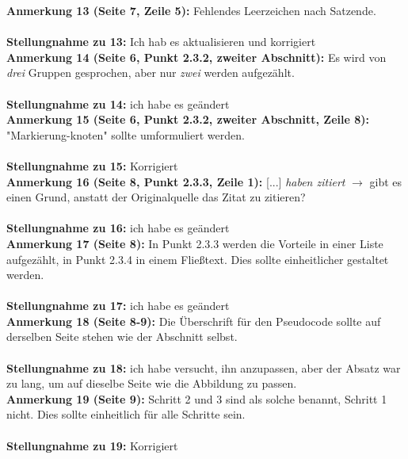 \documentclass[a4paper,12pt]{book}
\begin{document}
\noindent
\textbf{Anmerkung 13 (Seite 7, Zeile 5):}
Fehlendes Leerzeichen nach Satzende. \\
\\
\textbf{Stellungnahme zu 13:}
Ich hab es aktualisieren und korrigiert
\\

\noindent
\textbf{Anmerkung 14 (Seite 6, Punkt 2.3.2, zweiter Abschnitt):}
Es wird von \emph{drei} Gruppen gesprochen, aber nur \emph{zwei} werden aufgezählt.
 \\ \\
\textbf{Stellungnahme zu 14:} ich habe es geändert
\\

\noindent
\textbf{Anmerkung 15 (Seite 6, Punkt 2.3.2, zweiter Abschnitt, Zeile 8):}
"Markierung-knoten" sollte umformuliert werden. 
\\ \\
\textbf{Stellungnahme zu 15:} Korrigiert
\\

\noindent
\textbf{Anmerkung 16 (Seite 8, Punkt 2.3.3, Zeile 1):}
[...] \emph{haben zitiert} $\rightarrow$ gibt es einen Grund, anstatt der Originalquelle das Zitat zu zitieren? 
 \\ \\
\textbf{Stellungnahme zu 16:} ich habe es geändert
\\

\noindent
\textbf{Anmerkung 17 (Seite 8):}
In Punkt 2.3.3 werden die Vorteile in einer Liste aufgezählt, in Punkt 2.3.4 in einem Fließtext. Dies sollte einheitlicher gestaltet werden. 
\\ \\
\textbf{Stellungnahme zu 17:} ich habe es geändert
\\

\noindent
\textbf{Anmerkung 18 (Seite 8-9):}
Die Überschrift für den Pseudocode sollte auf derselben Seite stehen wie der Abschnitt selbst. \\ \\
\textbf{Stellungnahme zu 18:} ich habe versucht, ihn anzupassen, aber der Absatz war zu lang, um auf dieselbe Seite wie die Abbildung zu passen.
\\

\noindent
\textbf{Anmerkung 19 (Seite 9):}
Schritt 2 und 3 sind als solche benannt, Schritt 1 nicht. Dies sollte einheitlich für alle Schritte sein. 
\\ \\
\textbf{Stellungnahme zu 19:} Korrigiert
\\
\end{document}

